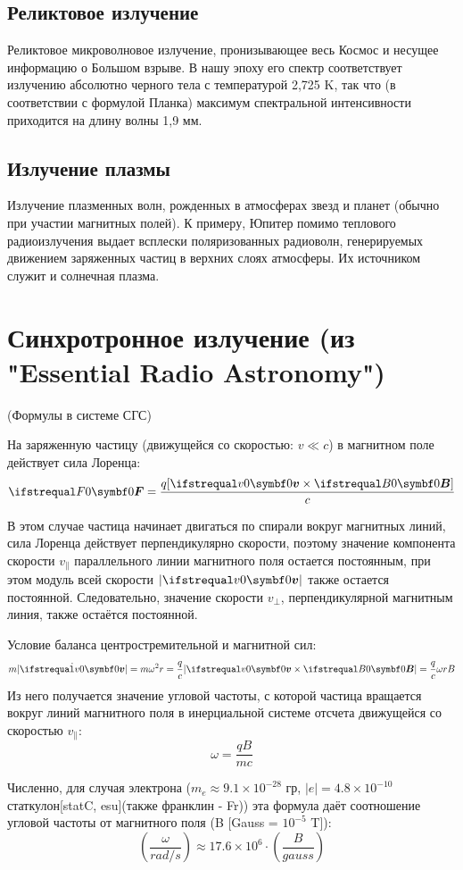 \documentclass[a4paper,12pt]{extarticle}
\begin{document}
\subsection{Реликтовое излучение}
Реликтовое микроволновое излучение, пронизывающее весь Космос и несущее информацию о Большом взрыве. В нашу эпоху его спектр соответствует излучению абсолютно черного тела с температурой 2,725 K, так что (в соответствии с формулой Планка) максимум спектральной интенсивности приходится на длину волны 1,9 мм.

\subsection{Излучение плазмы}
Излучение плазменных волн, рожденных в атмосферах звезд и планет (обычно при участии магнитных полей). К примеру, Юпитер помимо теплового радиоизлучения выдает всплески поляризованных радиоволн, генерируемых движением заряженных частиц в верхних слоях атмосферы. Их источником служит и солнечная плазма.


\section{Синхротронное излучение (из "Essential Radio Astronomy")}
    (Формулы в системе СГС)

    На заряженную частицу (движущейся со скоростью: $ v \ll c$)
    в магнитном поле действует сила Лоренца:
    \[ 
        \vecx{F} = \frac{q [\vecx{v} \times \vecx{B}]}{c}
    \]
    
    В этом случае частица начинает двигаться по спирали вокруг магнитных линий, сила Лоренца действует перпендикулярно скорости, поэтому значение компонента скорости $v_\parallel$ параллельного линии магнитного поля остается постоянным, при этом модуль всей скорости $|\vecx{v}|$ также остается постоянной. Следовательно, значение скорости $v_\perp$, перпендикулярной магнитным линия, также остаётся постоянной. 

    Условие баланса центростремительной и магнитной сил: 
    \[ 
        m|\dot{\vecx{v}}| = m\omega^2 r = \frac{q}{c} |\vecx{v} \times \vecx{B}| = \frac{q}{c} \omega r B 
    \]
    Из него получается значение угловой частоты, с которой частица вращается вокруг линий магнитного поля в инерциальной системе отсчета движущейся со скоростью $v_\parallel$: 
    \[ 
        \omega = \frac{qB}{mc} 
    \]

    Численно, для случая электрона ($m_e \approx 9.1\times 10^{-28} $ гр, $ |e| = 4.8\times 10^{-10} $ статкулон[statC, esu](также франклин - Fr)) эта формула даёт соотношение угловой частоты от магнитного поля (B [Gauss = $10^{-5}$ T]):
    \[
        \left(\frac{\omega}{rad/s}\right) \approx 17.6\times 10^6 \cdot \left(\frac{B}{gauss}\right)
    \]
\end{document}
